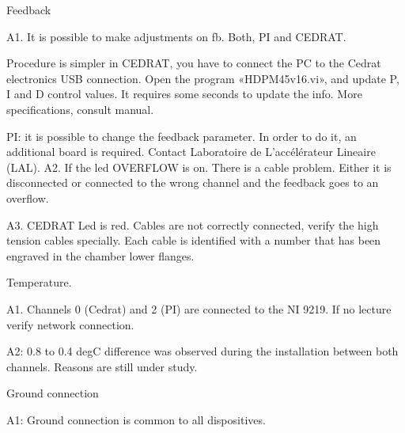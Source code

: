 Feedback\par 
A1. It is possible to make adjustments on fb. Both, PI and CEDRAT. \par 
Procedure is simpler in CEDRAT, you have to connect the PC to the Cedrat electronics USB connection. Open the program «HDPM45v16.vi», and update P, I and D control values. It requires some seconds to update the info. More specifications, consult manual.\par 
PI: it is possible to change the feedback parameter. In order to do it, an additional board is required. Contact Laboratoire de L'accélérateur Lineaire (LAL).
A2. If the led OVERFLOW is on. There is a cable problem. Either it is disconnected or connected to the wrong channel and the feedback goes to an overflow.\par 
A3. CEDRAT Led is red. Cables are not correctly connected, verify the high tension cables specially. Each cable is identified with a number that has been engraved in the chamber lower flanges.\par 

Temperature.\par 
A1. Channels 0 (Cedrat) and 2 (PI) are connected to the NI 9219. If no lecture verify network connection.\par 
A2: 0.8 to 0.4 degC difference was observed during the installation between both channels. Reasons are still under study.\par 

Ground connection\par 
A1: Ground connection is common to all dispositives. \par 